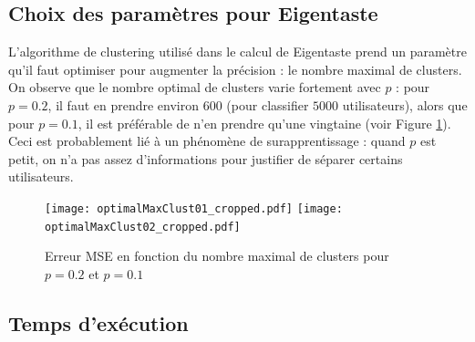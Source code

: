 \documentclass[11pt, openany, a4paper]{article}
\begin{document}
		
		
		
	\subsection{Choix des paramètres pour Eigentaste}
	
		L'algorithme de clustering utilisé dans le calcul de Eigentaste prend un paramètre qu'il faut optimiser pour augmenter la précision : le nombre maximal de clusters. On observe que le nombre optimal de clusters varie fortement avec $p$ : pour $p=0.2$, il faut en prendre environ $600$ (pour classifier $5000$ utilisateurs), alors que pour $p=0.1$, il est préférable de n'en prendre qu'une vingtaine (voir Figure \ref{clusterfig}). Ceci est probablement lié à un phénomène de surapprentissage : quand $p$ est petit, on n'a pas assez d'informations pour justifier de séparer certains utilisateurs.
		
		\begin{figure}[ht]
			\centering
			\texttt{[image: optimalMaxClust01\_cropped.pdf]}
			\texttt{[image: optimalMaxClust02\_cropped.pdf]}
			\caption{Erreur MSE en fonction du nombre maximal de clusters pour $p=0.2$ et $p=0.1$}
			\label{clusterfig}
		\end{figure}
		
	\subsection{Temps d'exécution}
	
\end{document}

